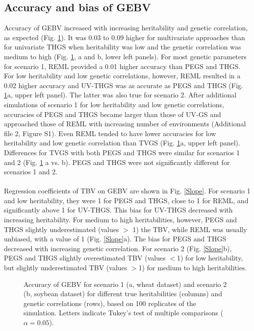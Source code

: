 \documentclass{bmcart}
\def\texttt{[image: ]}
\begin{document}
\subsection{Accuracy and bias of GEBV}

Accuracy of GEBV increased with increasing heritability and genetic correlation, as expected (Fig. \ref{Accuracy}). It was 0.03 to 0.09 higher for multivariate approaches than for univariate THGS when heritability was low and the genetic correlation was medium to high (Fig. \ref{Accuracy}, a and b, lower left panels). For most genetic parameters for scenario 1, REML provided a 0.01 higher accuracy than PEGS and THGS. For low heritability and low genetic correlations, however, REML resulted in a 0.02 higher accuracy and UV-THGS was as accurate as PEGS and THGS (Fig. \ref{Accuracy}a, upper left panel). The latter was also true for scenario 2. After additional simulations of scenario 1 for low heritability and low genetic correlations, accuracies of PEGS and THGS became larger than those of UV-GS and approached those of REML with increasing number of environments (Additional file 2, Figure S1).
Even REML tended to have lower accuracies for low heritability and low genetic correlation than TVGS (Fig. \ref{Accuracy}a, upper left panel). Differences for TVGS with both PEGS and THGS were similar for scenarios 1 and 2 (Fig. \ref{Accuracy} a vs. b). PEGS and THGS were not significantly different for scenarios 1 and 2.
\\\\
Regression coefficients of TBV on GEBV are shown in Fig. \ref{Slope}. For scenario 1 and low heritability, they were 1 for PEGS and THGS, close to 1 for REML, and significantly above 1 for UV-THGS. This bias for UV-THGS decreased with increasing heritability. For medium to high heritabilities, however, PEGS and THGS slightly underestimated (values $>$ 1) the TBV, while REML was usually unbiased, with a value of 1 (Fig. \ref{Slope}a). The bias for PEGS and THGS decreased with increasing genetic correlation. For scenario 2 (Fig. \ref{Slope}b), PEGS and THGS slightly overestimated TBV (values $<$1) for low heritability, but slightly underestimated TBV (values $>$1) for medium to high heritabilities. 

\begin{figure}[ht]
  \caption{\small{Accuracy of GEBV for scenario 1 (a, wheat dataset) and scenario 2 (b, soybean dataset) for different true heritabilities (columns) and genetic correlations (rows), based on 100 replicates of the simulation. Letters indicate Tukey's test of multiple comparisons ($\alpha=0.05$).}}
  \label{Accuracy}
\end{figure}
\end{document}
